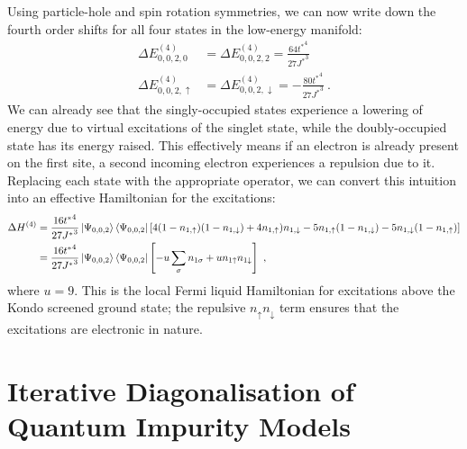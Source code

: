 Using particle-hole and spin rotation symmetries, we can now write down the fourth order shifts for all four states in the low-energy manifold:
\begin{equation}\begin{aligned}
	\Delta E^{(4)}_{0,0,2,0} &= \Delta E^{(4)}_{0,0,2,2} = \frac{64{t^*}^4}{27{J^*}^3}\\
	\Delta E^{(4)}_{0,0,2,\uparrow} &= \Delta E^{(4)}_{0,0,2,\downarrow} = -\frac{80{t^*}^4}{27{J^*}^3}~.
\end{aligned}\end{equation}
We can already see that the singly-occupied states experience a lowering of energy due to virtual excitations of the singlet state, while the doubly-occupied state has its energy raised. This effectively means if an electron is already present on the first site, a second incoming electron experiences a repulsion due to it. Replacing each state with the appropriate operator, we can convert this intuition into an effective Hamiltonian for the excitations:
\begin{equation}\begin{aligned}
	\Delta H^{(4)} &= \frac{16{t^*}^4}{27{J^*}^3}\ket{\Psi_{0,0,2}}\bra{\Psi_{0,0,2}}\left[4(1-n_{1,\uparrow})(1-n_{1,\downarrow}) + 4n_{1,\uparrow})n_{1,\downarrow} -5 n_{1,\uparrow}(1 - n_{1,\downarrow})-5n_{1,\downarrow}(1 - n_{1,\uparrow})\right]\\
				   &= \frac{16{t^*}^4}{27{J^*}^3}\ket{\Psi_{0,0,2}}\bra{\Psi_{0,0,2}}\left[-u \sum_\sigma n_{1\sigma} + u n_{1 \uparrow}n_{1 \downarrow}\right]~,
\end{aligned}\end{equation}
where \(u = 9\). This is the local Fermi liquid Hamiltonian for excitations above the Kondo screened ground state; the repulsive \(n_\uparrow n_\downarrow\) term ensures that the excitations are electronic in nature.

\section{Iterative Diagonalisation of Quantum Impurity Models}

